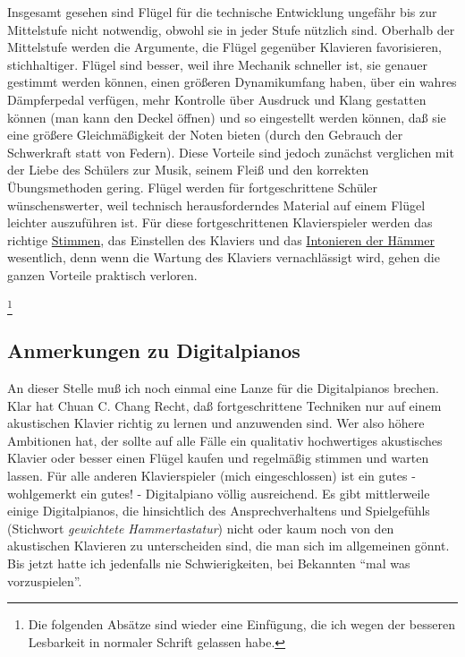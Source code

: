 Insgesamt gesehen sind Flügel für die technische Entwicklung ungefähr bis zur Mittelstufe nicht notwendig, obwohl sie in jeder Stufe nützlich sind.
Oberhalb der Mittelstufe werden die Argumente, die Flügel gegenüber Klavieren favorisieren, stichhaltiger.
Flügel sind besser, weil ihre Mechanik schneller ist, sie genauer gestimmt werden können, einen größeren Dynamikumfang haben, über ein wahres Dämpferpedal verfügen, mehr Kontrolle über Ausdruck und Klang gestatten können (man kann den Deckel öffnen) und so eingestellt werden können, daß sie eine größere Gleichmäßigkeit der Noten bieten (durch den Gebrauch der Schwerkraft statt von Federn).
Diese Vorteile sind jedoch zunächst verglichen mit der Liebe des Schülers zur Musik, seinem Fleiß und den korrekten Übungsmethoden gering.
Flügel werden für fortgeschrittene Schüler wünschenswerter, weil technisch herausforderndes Material auf einem Flügel leichter auszuführen ist.
Für diese fortgeschrittenen Klavierspieler werden das richtige \hyperref[c2_1]{Stimmen}, das Einstellen des Klaviers und das \hyperref[c2_7_hamm]{Intonieren der Hämmer} wesentlich, denn wenn die Wartung des Klaviers vernachlässigt wird, gehen die ganzen Vorteile praktisch verloren.
 

\hypertarget{c1iii17g}{}
\hypertarget{digital}{}

\footnote{Die folgenden Absätze sind wieder eine Einfügung, die ich wegen der besseren Lesbarkeit in normaler Schrift gelassen habe.}


\subsection{Anmerkungen zu Digitalpianos}

An dieser Stelle muß ich noch einmal eine Lanze für die Digitalpianos brechen.
Klar hat Chuan C. Chang Recht, daß fortgeschrittene Techniken nur auf einem akustischen Klavier richtig zu lernen und anzuwenden sind.
Wer also höhere Ambitionen hat, der sollte auf alle Fälle ein qualitativ hochwertiges akustisches Klavier oder besser einen Flügel kaufen und regelmäßig stimmen und warten lassen.
Für alle anderen Klavierspieler (mich eingeschlossen) ist ein gutes - wohlgemerkt ein gutes! - Digitalpiano völlig ausreichend.
Es gibt mittlerweile einige Digitalpianos, die hinsichtlich des Ansprechverhaltens und Spielgefühls (Stichwort \textit{gewichtete Hammertastatur}) nicht oder kaum noch von den akustischen Klavieren zu unterscheiden sind, die man sich im allgemeinen gönnt.
Bis jetzt hatte ich jedenfalls nie Schwierigkeiten, bei Bekannten \enquote{mal was vorzuspielen}.

